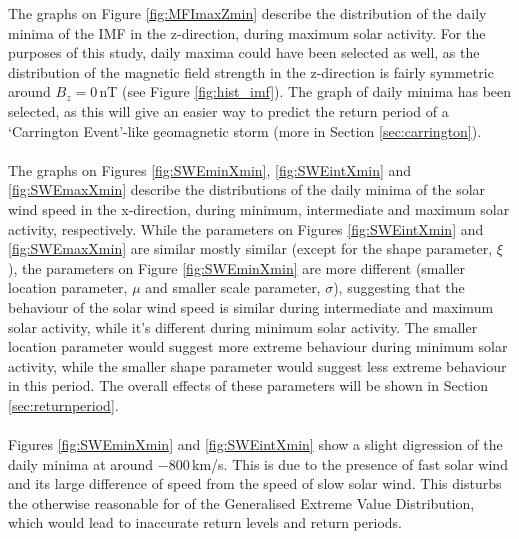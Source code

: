 \documentclass[12pt]{article}
\begin{document}
        The graphs on Figure \ref{fig:MFImaxZmin} describe the distribution of the daily minima of the IMF in the z-direction, during maximum solar activity. For the purposes of this study, daily maxima could have been selected as well, as the distribution of the magnetic field strength in the z-direction is fairly symmetric around $B_z=0\,$nT (see Figure \ref{fig:hist_imf}). The graph of daily minima has been selected, as this will give an easier way to predict the return period of a `Carrington Event'-like geomagnetic storm (more in Section \ref{sec:carrington}).\\ \\
        The graphs on Figures \ref{fig:SWEminXmin}, \ref{fig:SWEintXmin} and \ref{fig:SWEmaxXmin} describe the distributions of the daily minima of the solar wind speed in the x-direction, during minimum, intermediate and maximum solar activity, respectively. While the parameters on Figures \ref{fig:SWEintXmin} and \ref{fig:SWEmaxXmin} are similar mostly similar (except for the shape parameter, $\xi$), the parameters on Figure \ref{fig:SWEminXmin} are more different (smaller location parameter, $\mu$ and smaller scale parameter, $\sigma$), suggesting that the behaviour of the solar wind speed is similar during intermediate and maximum solar activity, while it's different during minimum solar activity. The smaller location parameter would suggest more extreme behaviour during minimum solar activity, while the smaller shape parameter would suggest less extreme behaviour in this period. The overall effects of these parameters will be shown in Section \ref{sec:returnperiod}.\\ \\
        Figures \ref{fig:SWEminXmin} and \ref{fig:SWEintXmin} show a slight digression of the daily minima at around $-800\,$km/s. This is due to the presence of fast solar wind and its large difference of speed from the speed of slow solar wind. This disturbs the otherwise reasonable for of the Generalised Extreme Value Distribution, which would lead to inaccurate return levels and return periods.\\
\end{document}
